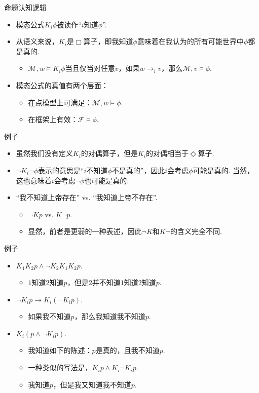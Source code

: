{命题认知逻辑}
\begin{itemize}
    \item 模态公式$K_i\phi$被读作“$i$知道$\phi$”.
    \item 从语义来说，$K_i$是$\Box$算子，即我知道$\phi$意味着在我认为的所有可能世界中$\phi$都是真的.
    \begin{itemize}
        \item $\mathcal M,w\vDash K_i\phi$当且仅当对任意$v$，如果$w\to_i v$，那么$\mathcal M,v\vDash\phi$.
    \end{itemize}
    \item 模态公式的真值有两个层面：
    \begin{itemize}
        \item 在点模型上可满足：$\mathcal M,w\vDash\phi$.
        \item 在框架上有效：$\mathcal F\vDash\phi$.
    \end{itemize}
\end{itemize}

{例子}
\begin{itemize}
    \item 虽然我们没有定义$K_i$的对偶算子，但是$K_i$的对偶相当于$\Diamond$算子.
    \item $\neg K_i\neg\phi$表示的意思是“$i$不知道$\phi$不是真的”，因此$i$会考虑$\phi$可能是真的. 当然，这也意味着$i$会考虑$\neg\phi$也可能是真的.
    \item “我不知道上帝存在” vs. “我知道上帝不存在”.
    \begin{itemize}
        \item $\neg Kp$ vs. $K\neg p$.
        \item 显然，前者是更弱的一种表述，因此$\neg K$和$K\neg$的含义完全不同.
    \end{itemize}
\end{itemize}


{例子}
\begin{itemize}
    \item $K_1K_2p\wedge \neg K_2K_1K_2 p$.
    \begin{itemize}
        \item $1$知道$2$知道$p$，但是$2$并不知道$1$知道$2$知道$p$.
    \end{itemize}
    \item $\neg K_i p\to K_i(\neg K_i p)$.
    \begin{itemize}
        \item 如果我不知道$p$，那么我知道我不知道$p$.
    \end{itemize}
    \item $K_i(p\wedge\neg K_i p)$.
    \begin{itemize}
        \item 我知道如下的陈述：$p$是真的，且我不知道$p$.
        \item 一种类似的写法是，$K_ip\wedge K_i\neg K_ip$.
        \item 我知道$p$，但是我又知道我不知道$p$.
    \end{itemize}
\end{itemize}


